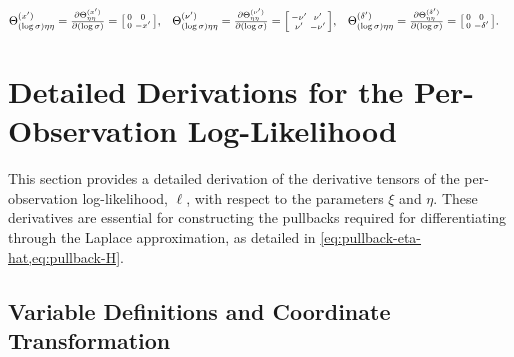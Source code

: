 \documentclass{article}
\begin{document}
\begin{align}
  \Theta_{(\log \sigma)\eta\eta}^{(x')} & = \tfrac{\partial \Theta_{\eta\eta}^{(x')}}{\partial (\log \sigma)} = \begin{bsmallmatrix} 0 & 0 \\ 0 & -x' \end{bsmallmatrix}, &  & \Theta_{(\log \sigma)\eta\eta}^{(\nu')} = \tfrac{\partial \Theta_{\eta\eta}^{(\nu')}}{\partial (\log \sigma)} = \begin{bsmallmatrix} -\nu' & \nu' \\ \nu' & -\nu' \end{bsmallmatrix}, &  & \Theta_{(\log \sigma)\eta\eta}^{(\delta')} = \tfrac{\partial \Theta_{\eta\eta}^{(\delta')}}{\partial (\log \sigma)} = \begin{bsmallmatrix} 0 & 0 \\ 0 & -\delta' \end{bsmallmatrix} \label{eq:third-derivative-theta-log-sigma-eta-eta}.
\end{align}




\appendix

\section{Detailed Derivations for the Per-Observation Log-Likelihood}

This section provides a detailed derivation of the derivative tensors of the per-observation log-likelihood, $\ell$, with respect to the parameters $\xi$ and $\eta$.
These derivatives are essential for constructing the pullbacks required for differentiating through the Laplace approximation, as detailed in \cref{eq:pullback-eta-hat,eq:pullback-H}.

\subsection{Variable Definitions and Coordinate Transformation}
\end{document}
